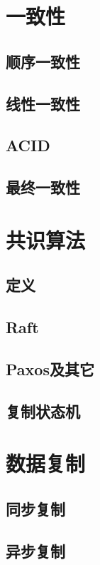 \documentclass[reqno,heading=true,fontset=macnew]{ctexbook}
\begin{document}





\chapter{一致性}
\section{顺序一致性}

\section{线性一致性}
\section{ACID}

\section{最终一致性}


\chapter{共识算法}
\section{定义}

\section{Raft}
\section{Paxos及其它}

\section{复制状态机}


\chapter{数据复制}
\section{同步复制}

\section{异步复制}
\end{document}
